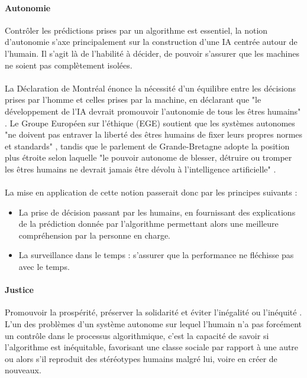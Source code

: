 \documentclass[10pt, french, a4paper]{article}
\begin{document}
\paragraph{Autonomie}
Contrôler les prédictions prises par un algorithme est essentiel, la notion d'autonomie s'axe principalement sur la construction d'une IA centrée autour de l'humain. Il s'agit là de l'habilité à décider, de pouvoir s'assurer que les machines ne soient pas complètement isolées.

\paragraph{}
La Déclaration de Montréal énonce la nécessité d'un équilibre entre les décisions prises par l'homme et celles prises par la machine, en déclarant que "le développement de l'IA devrait promouvoir l'autonomie de tous les êtres humains" \citep{universite_de_montreal_declaration_2017}. Le Groupe Européen sur l'éthique (EGE) soutient que les systèmes autonomes "ne doivent pas entraver la liberté des êtres humains de fixer leurs propres normes et standards" \citep{ege_ethics_2018}, tandis que le parlement de Grande-Bretagne adopte la position plus étroite selon laquelle "le pouvoir autonome de blesser, détruire ou tromper les êtres humains ne devrait jamais être dévolu à l'intelligence artificielle" \citep{uk_parliament_house_2017}.

\paragraph{}
La mise en application de cette notion passerait donc par les principes suivants :
\begin{itemize}
    \item La prise de décision passant par les humains, en fournissant des explications de la prédiction donnée par l'algorithme permettant alors une meilleure compréhension par la personne en charge.
    \item La surveillance dans le temps : s'assurer que la performance ne fléchisse pas avec le temps. 
\end{itemize}

\paragraph{Justice}
Promouvoir la prospérité, préserver la solidarité et éviter l'inégalité ou l'inéquité \citep{floridi_unified_2019}. L'un des problèmes d'un système autonome sur lequel l'humain n'a pas forcément un contrôle dans le processus algorithmique, c'est la capacité de savoir si l'algorithme est inéquitable, favorisant une classe sociale par rapport à une autre ou alors s'il reproduit des stéréotypes humains malgré lui, voire en créer de nouveaux.
\end{document}
